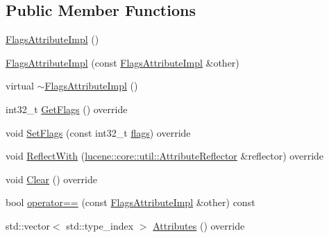\subsection*{Public Member Functions}
\begin{DoxyCompactItemize}
\item 
\mbox{\hyperlink{classlucene_1_1core_1_1analysis_1_1tokenattributes_1_1FlagsAttributeImpl_ac662a6d0887c9ffc42e3ef1ccc3f4256}{Flags\+Attribute\+Impl}} ()
\item 
\mbox{\hyperlink{classlucene_1_1core_1_1analysis_1_1tokenattributes_1_1FlagsAttributeImpl_ab9606f6a419551870e3c3233ff7a7954}{Flags\+Attribute\+Impl}} (const \mbox{\hyperlink{classlucene_1_1core_1_1analysis_1_1tokenattributes_1_1FlagsAttributeImpl}{Flags\+Attribute\+Impl}} \&other)
\item 
virtual \mbox{\hyperlink{classlucene_1_1core_1_1analysis_1_1tokenattributes_1_1FlagsAttributeImpl_a643fd4820ca208193923bb08a10ac889}{$\sim$\+Flags\+Attribute\+Impl}} ()
\item 
int32\+\_\+t \mbox{\hyperlink{classlucene_1_1core_1_1analysis_1_1tokenattributes_1_1FlagsAttributeImpl_aa3fb651752273e55f85419ef522eaa3e}{Get\+Flags}} () override
\item 
void \mbox{\hyperlink{classlucene_1_1core_1_1analysis_1_1tokenattributes_1_1FlagsAttributeImpl_a89376727686a4e0cc86db2154dc2ea49}{Set\+Flags}} (const int32\+\_\+t \mbox{\hyperlink{classlucene_1_1core_1_1analysis_1_1tokenattributes_1_1FlagsAttributeImpl_ac0a726a7b082414bcac0d9a5dc9ab4bb}{flags}}) override
\item 
void \mbox{\hyperlink{classlucene_1_1core_1_1analysis_1_1tokenattributes_1_1FlagsAttributeImpl_aa479cdc4474246af90f7d54ca64d3a48}{Reflect\+With}} (\mbox{\hyperlink{namespacelucene_1_1core_1_1util_a7dbb701adaed055f73fb95eec83da10a}{lucene\+::core\+::util\+::\+Attribute\+Reflector}} \&reflector) override
\item 
void \mbox{\hyperlink{classlucene_1_1core_1_1analysis_1_1tokenattributes_1_1FlagsAttributeImpl_a67ed39990f3f9eac90c91e880ad5cc31}{Clear}} () override
\item 
bool \mbox{\hyperlink{classlucene_1_1core_1_1analysis_1_1tokenattributes_1_1FlagsAttributeImpl_a93a0ee49b92c39e0a0d55c1f061f0ac2}{operator==}} (const \mbox{\hyperlink{classlucene_1_1core_1_1analysis_1_1tokenattributes_1_1FlagsAttributeImpl}{Flags\+Attribute\+Impl}} \&other) const
\item 
std\+::vector$<$ std\+::type\+\_\+index $>$ \mbox{\hyperlink{classlucene_1_1core_1_1analysis_1_1tokenattributes_1_1FlagsAttributeImpl_a3cdbd466551489b6f35ad51aa5ee2255}{Attributes}} () override

\end{DoxyCompactItemize}
